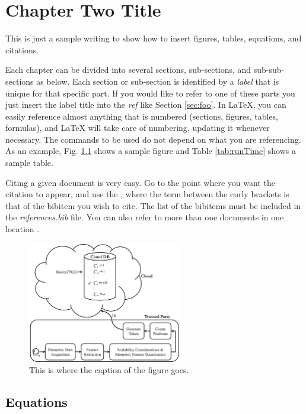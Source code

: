 \chapter{Chapter Two Title} \label{chap:1}

This is just a sample writing to show how to insert figures, tables, equations, and citations.

Each chapter can be divided into several sections, sub-sections, and sub-sub-sections as below. Each section or sub-section is identified by a \emph{label} that is unique for that specific part. If you would like to refer to one of these parts you just insert the label title into the \emph{ref} like Section \ref{sec:foo}. 
In LaTeX, you can easily reference almost anything that is numbered (sections, figures, tables, formulas), and LaTeX will take care of numbering, updating it whenever necessary. The commands to be used do not depend on what you are referencing.
As an example, Fig. \ref{fig:big-picture} shows a sample figure and Table \ref{tab:runTime} shows a sample table. 

Citing a given document is very easy. Go to the point where you want the citation to appear, and use the \cite{haghighat2015cloudid}, where the term between the curly brackets is that of the bibitem you wish to cite. The list of the bibitems must be included in the \emph{references.bib} file. You can also refer to more than one documents in one location \cite{haghighat2016discriminant1, haghighat2013identification, haghighat2016discriminant2}. 


\begin{figure}[t]
\centering
\includegraphics[width=0.6\textwidth]{./Figures/big-picture.png}
\caption{This is where the caption of the figure goes.}
\label{fig:big-picture}
\end{figure}



\section{Equations} \label{sec:equation}

